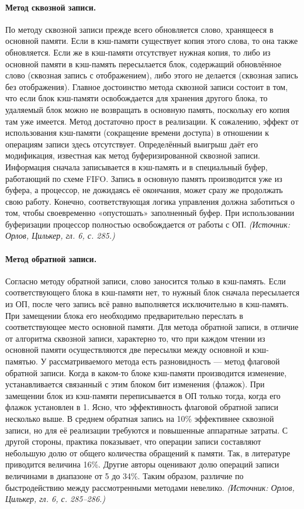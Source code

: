 \documentclass[a4paper,12pt]{article}
\begin{document}
\paragraph{Метод сквозной записи.}
По методу сквозной записи прежде всего обновляется слово, хранящееся в основной памяти. Если в кэш-памяти существует копия этого слова, то она также обновляется. Если же в кэш-памяти отсутствует нужная копия, то либо из основной памяти в кэш-память пересылается блок, содержащий обновлённое слово (сквозная запись с отображением), либо этого не делается (сквозная запись без отображения). Главное достоинство метода сквозной записи состоит в том, что если блок кэш-памяти освобождается для хранения другого блока, то удаляемый блок можно не возвращать в основную память, поскольку его копия там уже имеется. Метод достаточно прост в реализации. К сожалению, эффект от использования кэш-памяти (сокращение времени доступа) в отношении к операциям записи здесь отсутствует. Определённый выигрыш даёт его модификация, известная как метод буферизированной сквозной записи. Информация сначала записывается в кэш-память и в специальный буфер, работающий по схеме FIFO. Запись в основную память производится уже из буфера, а процессор, не дожидаясь её окончания, может сразу же продолжать свою работу. Конечно, соответствующая логика управления должна заботиться о том, чтобы своевременно «опустошать» заполненный буфер. При использовании буферизации процессор полностью освобождается от работы с ОП.
\textit{(Источник: Орлов, Цилькер, гл. 6, с. 285.)}

\paragraph{Метод обратной записи.}
Согласно методу обратной записи, слово заносится только в кэш-память. Если соответствующего блока в кэш-памяти нет, то нужный блок сначала пересылается из ОП, после чего запись всё равно выполняется исключительно в кэш-память. При замещении блока его необходимо предварительно переслать в соответствующее место основной памяти. Для метода обратной записи, в отличие от алгоритма сквозной записи, характерно то, что при каждом чтении из основной памяти осуществляются две пересылки между основной и кэш-памятью. У рассматриваемого метода есть разновидность --- метод флаговой обратной записи. Когда в каком-то блоке кэш-памяти производится изменение, устанавливается связанный с этим блоком бит изменения (флажок). При замещении блок из кэш-памяти переписывается в ОП только тогда, когда его флажок установлен в 1. Ясно, что эффективность флаговой обратной записи несколько выше. В среднем обратная запись на 10\% эффективнее сквозной записи, но для её реализации требуются и повышенные аппаратные затраты. С другой стороны, практика показывает, что операции записи составляют небольшую долю от общего количества обращений к памяти. Так, в литературе приводится величина 16\%. Другие авторы оценивают долю операций записи величинами в диапазоне от 5 до 34\%. Таким образом, различие по быстродействию между рассмотренными методами невелико.
\textit{(Источник: Орлов, Цилькер, гл. 6, с. 285--286.)}
\end{document}
